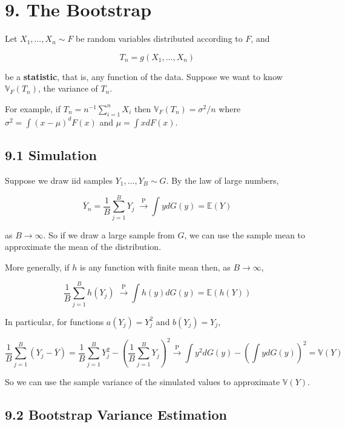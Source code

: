 \section*{9. The Bootstrap}\label{the-bootstrap}

Let \(X_{1}, \dots, X_{n} \sim F\) be random variables distributed according
to \(F\), and

\[ T_{n} = g(X_{1}, \dots, X_{n})\]

be a \textbf{statistic}, that is, any function of the data. Suppose we
want to know \(\mathbb{V}_F(T_{n})\), the variance of \(T_{n}\).

For example, if \(T_{n} = n^{-1}\sum_{i=1}^{n}X_{i}\) then
\(\mathbb{V}_F(T_{n}) = \sigma^{2}/n\) where
\(\sigma^{2} = \int (x - \mu)^{d}F(x)\) and \(\mu = \int x dF(x)\).

\subsection*{9.1 Simulation}\label{bootstrap:simulation}

Suppose we draw iid samples \(Y_{1}, \dots, Y_B \sim G\). By the law of
large numbers,

\[ \overline{Y}_{n} = \frac{1}{B} \sum_{j=1}^B Y_{j} \; \xrightarrow{\text{P}} \int y dG(y) = \mathbb{E}(Y)\]

as \(B \rightarrow \infty\). So if we draw a large sample from \(G\), we
can use the sample mean to approximate the mean of the distribution.

More generally, if \(h\) is any function with finite mean then, as
\(B \rightarrow \infty\),

\[\frac{1}{B} \sum_{j=1}^B h(Y_{j}) \; \xrightarrow{\text{P}} \int h(y) dG(y) = \mathbb{E}(h(Y))\]

In particular, for functions \(a(Y_{j}) = Y_{j}^{2}\) and \(b(Y_{j}) = Y_{j}\),

\[\frac{1}{B} \sum_{j=1}^B (Y_{j} - \overline{Y}) 
= \frac{1}{B} \sum_{j=1}^B Y_{j}^{2} - \left(\frac{1}{B} \sum_{j=1}^B Y_{j} \right)^{2}
\xrightarrow{\text{P}} \int y^{2} dG(y) - \left( \int y dG(y) \right)^{2} = \mathbb{V}(Y)
\]

So we can use the sample variance of the simulated values to approximate
\(\mathbb{V}(Y)\).

\subsection*{9.2 Bootstrap Variance
Estimation}\label{bootstrap:variance}

